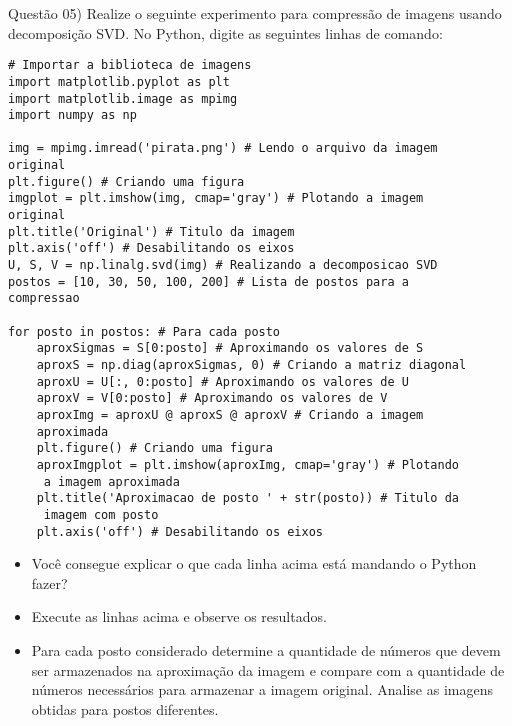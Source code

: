 
\noindent \textcolor{COLOR1}{Questão 05)} Realize o seguinte experimento para compressão de imagens
usando decomposição SVD. No Python, digite as seguintes linhas de comando:
\\

\begin{lstlisting}
# Importar a biblioteca de imagens
import matplotlib.pyplot as plt
import matplotlib.image as mpimg 
import numpy as np 

img = mpimg.imread('pirata.png') # Lendo o arquivo da imagem 
original
plt.figure() # Criando uma figura
imgplot = plt.imshow(img, cmap='gray') # Plotando a imagem 
original
plt.title('Original') # Titulo da imagem
plt.axis('off') # Desabilitando os eixos
U, S, V = np.linalg.svd(img) # Realizando a decomposicao SVD
postos = [10, 30, 50, 100, 200] # Lista de postos para a 
compressao

for posto in postos: # Para cada posto
    aproxSigmas = S[0:posto] # Aproximando os valores de S
    aproxS = np.diag(aproxSigmas, 0) # Criando a matriz diagonal
    aproxU = U[:, 0:posto] # Aproximando os valores de U
    aproxV = V[0:posto] # Aproximando os valores de V
    aproxImg = aproxU @ aproxS @ aproxV # Criando a imagem 
    aproximada
    plt.figure() # Criando uma figura
    aproxImgplot = plt.imshow(aproxImg, cmap='gray') # Plotando
     a imagem aproximada
    plt.title('Aproximacao de posto ' + str(posto)) # Titulo da
     imagem com posto
    plt.axis('off') # Desabilitando os eixos
\end{lstlisting}

\begin{figure}[htbp]
    \centering
    \quad
    \quad
    \quad
    \quad
    \quad
\end{figure}


\begin{itemize}
    \item Você consegue explicar o que cada linha acima está mandando o Python fazer?
    \item Execute as linhas acima e observe os resultados.
    \item Para cada posto considerado determine a quantidade de números que devem ser armazenados na aproximação da imagem e compare com a quantidade de números necessários para armazenar a imagem original. Analise as imagens obtidas para postos diferentes.
\end{itemize}

